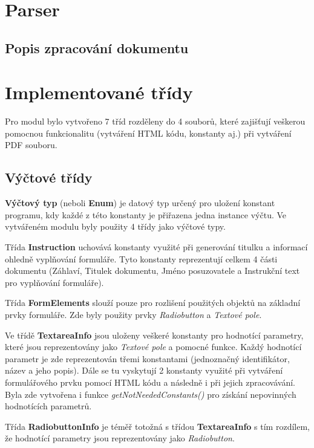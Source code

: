 
\section{Parser}

\subsection{Popis zpracování dokumentu}

\section{Implementované třídy}
Pro modul bylo vytvořeno 7 tříd rozděleny do 4 souborů, které zajišťují veškerou pomocnou funkcionalitu (vytváření HTML kódu, konstanty aj.) při vytváření PDF souboru. 
\subsection{Výčtové třídy}
\textbf{Výčtový typ} (neboli \textbf{Enum}) je datový typ určený pro uložení konstant programu, kdy každé z této konstanty je přiřazena jedna instance výčtu. Ve vytvářeném modulu byly použity 4 třídy jako výčtové typy. 
\par
Třída \textbf{Instruction} uchovává konstanty využité při generování titulku a informací ohledně vyplňování formuláře. Tyto konstanty reprezentují celkem 4 části dokumentu (Záhlaví, Titulek dokumentu, Jméno posuzovatele a Instrukční text pro vyplňování formuláře).
\par
Třída \textbf{FormElements} slouží pouze pro rozlišení použitých objektů na základní prvky formuláře. Zde byly použity prvky \textit{Radiobutton} a \textit{Textové pole}.
\par
Ve třídě \textbf{TextareaInfo} jsou uloženy veškeré konstanty pro hodnotící parametry, které jsou reprezentovány jako \textit{Textové pole} a pomocné funkce. Každý hodnotící parametr je zde reprezentován třemi konstantami (jednoznačný identifikátor, název a jeho popis). Dále se tu vyskytují 2 konstanty využité při vytváření formulářového prvku pomocí HTML kódu a následně i při jejich zpracovávání. Byla zde vytvořena i funkce \textit{getNotNeededConstants()} pro získání nepovinných hodnotících parametrů.
\par
Třída \textbf{RadiobuttonInfo} je téměř totožná s třídou \textbf{TextareaInfo} s tím rozdílem, že hodnotící parametry jsou reprezentovány jako \textit{Radiobutton}.
